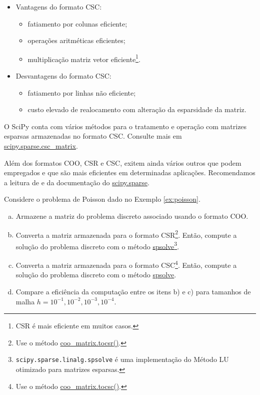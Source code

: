 \begin{itemize}
\item Vantagens do formato CSC:
  \begin{itemize}
  \item fatiamento por colunas eficiente;
  \item operações aritméticas eficientes;
  \item multiplicação matriz vetor eficiente\footnote{CSR é mais eficiente em muitos casos.}.
  \end{itemize}
\item Desvantagens do formato CSC:
  \begin{itemize}
  \item fatiamento por linhas não eficiente;
  \item custo elevado de realocamento com alteração da esparsidade da matriz.
  \end{itemize}
\end{itemize}

\begin{obs}
  O SciPy conta com vários métodos para o tratamento e operação com matrizes esparsas armazenadas no formato CSC. Consulte mais em \href{https://docs.scipy.org/doc/scipy/reference/generated/scipy.sparse.csc_matrix.html}{scipy.sparse.csc\_matrix}.
\end{obs}

\begin{obs}
  Além dos formatos COO, CSR e CSC, exitem ainda vários outros que podem empregados e que são mais eficientes em determinadas aplicações. Recomendamos a leitura de \cite[Seção 3.4]{Saad2003} e da documentação do \href{https://docs.scipy.org/doc/scipy/reference/sparse.html}{scipy.sparse}.
\end{obs}

\begin{exer}
  Considere o problema de Poisson dado no Exemplo \ref{ex:poisson}.
  \begin{enumerate}[a)]
  \item Armazene a matriz do problema discreto associado usando o formato COO.
  \item Converta a matriz armazenada para o formato CSR\footnote{Use o método \href{https://docs.scipy.org/doc/scipy/reference/generated/scipy.sparse.coo_matrix.tocsr.html}{coo\_matrix.tocsr()}.}. Então, compute a solução do problema discreto com o método \href{https://docs.scipy.org/doc/scipy/reference/generated/scipy.sparse.linalg.spsolve.html}{spsolve}\footnote{\lstinline+scipy.sparse.linalg.spsolve+ é uma implementação do Método LU otimizado para matrizes esparsas.}.
  \item Converta a matriz armazenada para o formato CSC\footnote{Use o método \href{https://docs.scipy.org/doc/scipy/reference/generated/scipy.sparse.coo_matrix.tocsc.html}{coo\_matrix.tocsc()}.}. Então, compute a solução do problema discreto com o método \href{https://docs.scipy.org/doc/scipy/reference/generated/scipy.sparse.linalg.spsolve.html}{spsolve}.
  \item Compare a eficiência da computação entre os itens b) e c) para tamanhos de malha $h = 10^{-1}, 10^{-2}, 10^{-3}, 10^{-4}$.
  \end{enumerate}
\end{exer}

